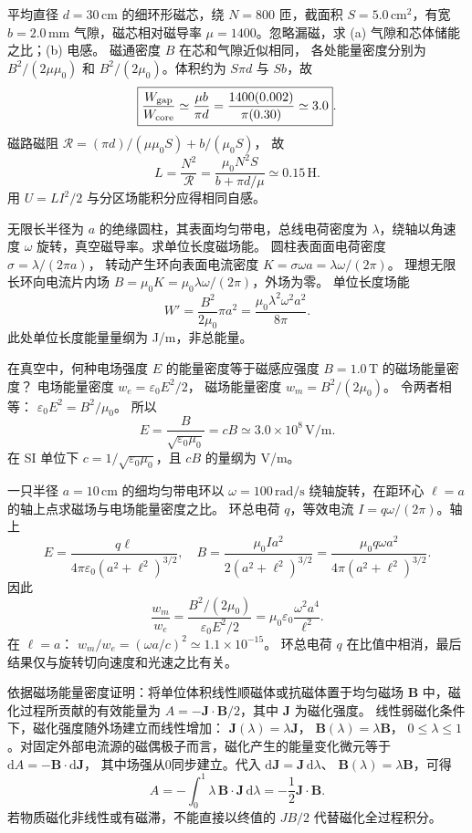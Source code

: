 平均直径 $d=30\,\mathrm{cm}$ 的细环形磁芯，绕 $N=800$ 匝，截面积 $S=5.0\,\mathrm{cm^2}$，有宽 $b=2.0\,\mathrm{mm}$ 气隙，磁芯相对磁导率 $\mu=1400$。忽略漏磁，求 (a) 气隙和芯体储能之比；(b) 电感。
\exsolution
磁通密度 $B$ 在芯和气隙近似相同，
各处能量密度分别为 $B^2/(2\mu\mu_0)$ 和 $B^2/(2\mu_0)$。体积约为 $S\pi d$ 与 $Sb$，故
\[
\boxed{\frac{W_{\rm gap}}{W_{\rm core}}
\simeq\frac{\mu b}{\pi d}
=\frac{1400(0.002)}{\pi(0.30)}\simeq3.0}.
\]
磁路磁阻
$\mathcal R=(\pi d)/(\mu\mu_0S)+b/(\mu_0S)$，
故
\[
\boxed{L=\frac{N^2}{\mathcal R}
=\frac{\mu_0N^2S}{b+\pi d/\mu}
\simeq0.15\,\mathrm H}.
\]
\excheck 用 $U=LI^2/2$ 与分区场能积分应得相同自感。

无限长半径为 $a$ 的绝缘圆柱，其表面均匀带电，总线电荷密度为 $\lambda$，绕轴以角速度 $\omega$ 旋转，真空磁导率。求单位长度磁场能。
\exsolution
圆柱表面面电荷密度
$\sigma=\lambda/(2\pi a)$，
转动产生环向表面电流密度
$K=\sigma\omega a=\lambda\omega/(2\pi)$。
理想无限长环向电流片内场
$B=\mu_0K=\mu_0\lambda\omega/(2\pi)$，外场为零。
单位长度场能
\[
W'=\frac{B^2}{2\mu_0}\pi a^2
=\boxed{\frac{\mu_0\lambda^2\omega^2a^2}{8\pi}}.
\]
\excheck 此处单位长度能量量纲为 J/m，非总能量。

在真空中，何种电场强度 $E$ 的能量密度等于磁感应强度 $B=1.0\,\mathrm T$ 的磁场能量密度？
\exsolution
电场能量密度 $w_e=\varepsilon_0E^2/2$，
磁场能量密度 $w_m=B^2/(2\mu_0)$。
令两者相等：
$\varepsilon_0E^2=B^2/\mu_0$。
所以
\[
\boxed{E=\frac B{\sqrt{\varepsilon_0\mu_0}}=cB
\simeq3.0\times10^8\,\mathrm{V/m}}.
\]
\excheck 在 SI 单位下 $c=1/\sqrt{\varepsilon_0\mu_0}$，且 $cB$ 的量纲为 V/m。

一只半径 $a=10\,\mathrm{cm}$ 的细均匀带电环以 $\omega=100\,\mathrm{rad/s}$ 绕轴旋转，在距环心 $\ell=a$ 的轴上点求磁场与电场能量密度之比。
\exsolution
环总电荷 $q$，等效电流
$I=q\omega/(2\pi)$。轴上
\[
E=\frac{q\ell}{4\pi\varepsilon_0(a^2+\ell^2)^{3/2}},
\quad
B=\frac{\mu_0Ia^2}{2(a^2+\ell^2)^{3/2}}
=\frac{\mu_0q\omega a^2}{4\pi(a^2+\ell^2)^{3/2}}.
\]
因此
\[
\frac{w_m}{w_e}
=\frac{B^2/(2\mu_0)}{\varepsilon_0E^2/2}
=\boxed{\mu_0\varepsilon_0\frac{\omega^2a^4}{\ell^2}}.
\]
在 $\ell=a$：
$\boxed{w_m/w_e=(\omega a/c)^2\simeq1.1\times10^{-15}}$。
\excheck 环总电荷 $q$ 在比值中相消，最后结果仅与旋转切向速度和光速之比有关。

依据磁场能量密度证明：将单位体积线性顺磁体或抗磁体置于均匀磁场 $\bm B$ 中，磁化过程所贡献的有效能量为
$A=-\bm J\cdot\bm B/2$，其中 $\bm J$ 为磁化强度。
\exsolution
线性弱磁化条件下，磁化强度随外场建立而线性增加：
$\bm J(\lambda)=\lambda\bm J$，
$\bm B(\lambda)=\lambda\bm B$，
$0\le\lambda\le1$。对固定外部电流源的磁偶极子而言，磁化产生的能量变化微元等于
$\mathrm dA=-\bm B\cdot\mathrm d\bm J$，
其中场强从0同步建立。代入
$\mathrm d\bm J=\bm J\,\mathrm d\lambda$、
$\bm B(\lambda)=\lambda\bm B$，可得
\[
A=-\int_0^1\lambda\,\bm B\cdot\bm J\,\mathrm d\lambda
=\boxed{-\frac12\bm J\cdot\bm B}.
\]
\excheck 若物质磁化非线性或有磁滞，不能直接以终值的 $JB/2$ 代替磁化全过程积分。

